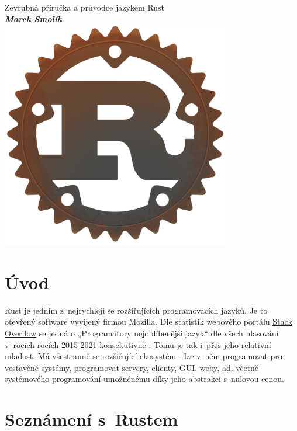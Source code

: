 \documentclass[a4paper, 12pt]{article} %
\begin{document}
\thispagestyle{empty}
\begin{center}
    {\LARGE Zevrubná příručka a průvodce jazykem Rust} \\ [1cm]
    \textbf{\textit{\Large Marek Smolík}} \\ [4cm]
    \includegraphics[width=10cm]{logo_alt.png}
\end{center}

\vfill

\newpage
\thispagestyle{empty}
\vspace*{\fill}

\tableofcontents

\newpage


\section*{Úvod}
    Rust je jedním z~nejrychleji se rozšiřujících programovacích jazyků. Je to otevřený software vyvíjený firmou Mozilla. Dle statistik webového portálu \href{https://stackoverflow.com/}{Stack Overflow} se jedná o  „Programátory nejoblíbenější jazyk“ dle všech hlasování v~rocích rocích 2015-2021 konsekutivně \cite{stack}. Tomu je tak i~přes jeho relativní mladost. Má všestranně se rozšiřující ekosystém - lze v~něm programovat pro vestavěné systémy, programovat servery, clienty, GUI, weby, ad. včetně systémového programování umožnénému díky jeho abstrakci s~nulovou cenou.


\section*{Seznámení s~Rustem}
\end{document}
